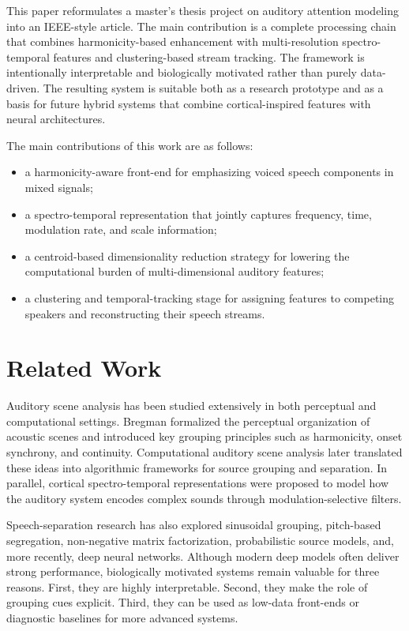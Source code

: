 \documentclass[conference]{IEEEtran}
\begin{document}
This paper reformulates a master's thesis project on auditory attention modeling into an IEEE-style article. The main contribution is a complete processing chain that combines harmonicity-based enhancement with multi-resolution spectro-temporal features and clustering-based stream tracking. The framework is intentionally interpretable and biologically motivated rather than purely data-driven. The resulting system is suitable both as a research prototype and as a basis for future hybrid systems that combine cortical-inspired features with neural architectures.

The main contributions of this work are as follows:
\begin{itemize}
    \item a harmonicity-aware front-end for emphasizing voiced speech components in mixed signals;
    \item a spectro-temporal representation that jointly captures frequency, time, modulation rate, and scale information;
    \item a centroid-based dimensionality reduction strategy for lowering the computational burden of multi-dimensional auditory features;
    \item a clustering and temporal-tracking stage for assigning features to competing speakers and reconstructing their speech streams.
\end{itemize}

\section{Related Work}
Auditory scene analysis has been studied extensively in both perceptual and computational settings. Bregman formalized the perceptual organization of acoustic scenes and introduced key grouping principles such as harmonicity, onset synchrony, and continuity. Computational auditory scene analysis later translated these ideas into algorithmic frameworks for source grouping and separation. In parallel, cortical spectro-temporal representations were proposed to model how the auditory system encodes complex sounds through modulation-selective filters.

Speech-separation research has also explored sinusoidal grouping, pitch-based segregation, non-negative matrix factorization, probabilistic source models, and, more recently, deep neural networks. Although modern deep models often deliver strong performance, biologically motivated systems remain valuable for three reasons. First, they are highly interpretable. Second, they make the role of grouping cues explicit. Third, they can be used as low-data front-ends or diagnostic baselines for more advanced systems.
\end{document}
